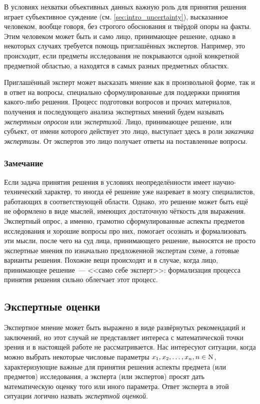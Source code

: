 В условиях нехватки объективных данных важную роль для принятия решения играет субъективное суждение (см. \ref{sec:intro_uncertainty}), высказанное человеком, вообще говоря, без строгого обоснования и твёрдой опоры на факты. Этим человеком может быть и само лицо, принимающее решение, однако в некоторых случаях требуется помощь приглашённых экспертов. Например, это происходит, если предметы исследования не покрываются одной конкретной предметной областью, а находятся в самых разных предметных областях.  

Приглашённый эксперт может высказать мнение как в произвольной форме, так и в ответ на вопросы, специально сформулированные для поддержки принятия какого-либо решения. Процесс подготовки вопросов и прочих материалов, получения и последующего анализа экспертных мнений будем называть {\sl экспертным опросом} или {\sl экспертизой}. Лицо, принимающее решение, или субъект, от имени которого действует это лицо, выступает здесь в роли {\sl заказчика экспертизы}. От экспертов это лицо получает ответы на поставленные вопросы.
 
\subsubsection*{Замечание}
\begin{notice}
Если задача принятия решения в условиях неопределённости имеет научно-технический характер, то иногда её решение уже назревает в мозгу специалистов, работающих в соответствующей области. Однако, это решение может быть ещё не оформлено в виде мыслей, имеющих достаточную чёткость для выражения. Экспертный опрос, а именно, грамотно сформулированные аспекты предметов исследования и хорошие вопросы про них, помогает осознать и формализовать эти мысли, после чего на суд лица, принимающего решение, выносятся не просто экспертные мнения по изначально предложенной экспертам схеме, а готовые варианты решения. Похожие вещи происходят и в случае, когда лицо, принимающее решение~--- <<само себе эксперт>>: формализация процесса принятия решения сильно облегчает этот процесс. 
\end{notice}

\subsection{Экспертные оценки}
\label{sec:intro_asessment}

Экспертное мнение может быть выражено в виде развёрнутых рекомендаций и заключений, но этот случай не представляет интереса с математической точки зрения и в настоящей работе не рассматривается. Нас интересуют ситуации, когда можно выбрать некоторые числовые параметры $x_1, x_2, \ldots, x_n, n \in {\mathrm{N}}$, характеризующие важные для принятия решения аспекты предмета (или предметов) исследования, а эксперта (или экспертов) просят дать математическую оценку того или иного параметра. Ответ эксперта в этой ситуации логично назвать {\sl экспертной оценкой}. 

